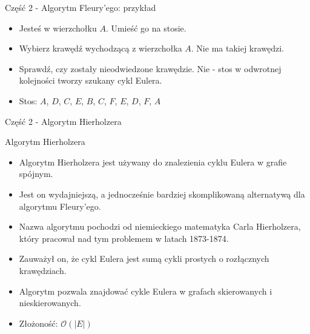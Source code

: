 \documentclass[polish,envcountsect,10pt]{beamer}
\begin{document}
\begin{frame}{Część 2 - Algorytm Fleury'ego: przykład}
    \begin{itemize}
        \item Jesteś w wierzchołku $A$. Umieść go na stosie.
        \item Wybierz krawędź wychodzącą z wierzchołka $A$. Nie ma takiej krawędzi.
        \item Sprawdź, czy zostały nieodwiedzone krawędzie. Nie - stos w odwrotnej kolejności tworzy szukany cykl Eulera.
        \item Stos: $A$, $D$, $C$, $E$, $B$, $C$, $F$, $E$, $D$, $F$, $A$
    \end{itemize}
    \begin{center}
    \end{center}
\end{frame}

\begin{frame}{Część 2 - Algorytm Hierholzera}
    \begin{block}{Algorytm Hierholzera}
        \begin{itemize}
            \item Algorytm Hierholzera jest używany do znalezienia cyklu Eulera w grafie spójnym.
            \item Jest on wydajniejszą, a jednocześnie bardziej skomplikowaną alternatywą dla algorytmu Fleury'ego.
            \item Nazwa algorytmu pochodzi od niemieckiego matematyka Carla Hierholzera, który pracował nad tym problemem w latach 1873-1874.
            \item Zauważył on, że cykl Eulera jest sumą cykli prostych o rozłącznych krawędziach.
            \item Algorytm pozwala znajdować cykle Eulera w grafach skierowanych i nieskierowanych.
            \item Złożoność: $\mathcal{O}(|E|)$
        \end{itemize}
    \end{block}
\end{frame}
    
\end{document}
